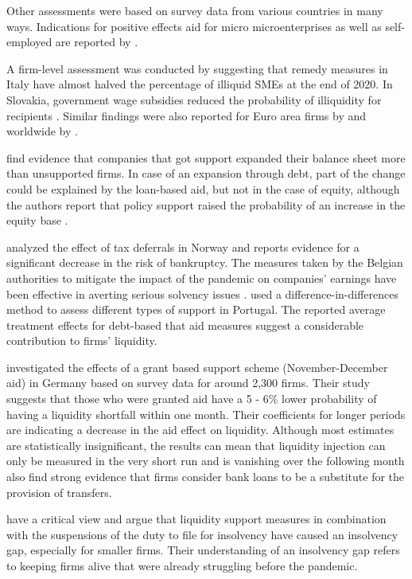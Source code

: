 Other assessments were based on survey data from various countries in many ways. Indications for positive effects aid for micro microenterprises as well as self-employed are reported by \parencite{kochaniak_effectiveness_2023,bertschek_german_2022}.

A firm-level assessment was conducted by \parencite{bellucci_consequences_2022} suggesting that remedy measures in Italy have almost halved the percentage of illiquid SMEs at the end of 2020. 
In Slovakia, government wage subsidies reduced the probability of illiquidity for recipients \parencite{lalinsky_distribution_2021}.
Similar findings were also reported for Euro area firms by \parencite{de_santis_impact_2021} and worldwide by \parencite{igan_shot_2023}.

\parencite{harasztosi_firm-level_2022} find evidence that companies that got support expanded their balance sheet more than unsupported firms. In case of an expansion through debt, part of the change could be explained by the loan-based aid, but not in the case of equity, although the authors report that policy support raised the probability of an increase in the equity base \parencite{harasztosi_firm-level_2022}.

\parencite{stien_covid-19_2022} analyzed the effect of tax deferrals in Norway and reports evidence for a significant decrease in the risk of bankruptcy.
The measures taken by the Belgian authorities to mitigate the impact of the pandemic on companies' earnings have been effective in averting serious solvency issues \parencite{piette_how_2022}.
\parencite{costa_state-aids_2021} used a difference-in-differences method to assess different types of support in Portugal. The reported average treatment effects for debt-based that aid measures suggest a considerable contribution to firms' liquidity.

\parencite{marek_impact_2022} investigated the effects of a grant based support scheme (November-December aid) in Germany based on survey data for around 2,300 firms. Their study suggests that those who were granted aid have a 5 - 6\% lower probability of having a liquidity shortfall within one month. Their coefficients for longer periods are indicating a decrease in the aid effect on liquidity. Although most estimates are statistically insignificant, the results can mean that liquidity injection can only be measured in the very short run and is vanishing over the following month \parencite{marek_impact_2022} also find strong evidence that firms consider bank loans to be a substitute for the provision of transfers.

\parencite{dorr_small_2022} have a critical view and argue that liquidity support measures in combination with the suspensions of the duty to file for insolvency have caused an insolvency gap, especially for smaller firms. Their understanding of an insolvency gap refers to keeping firms alive that were already struggling before the pandemic.

